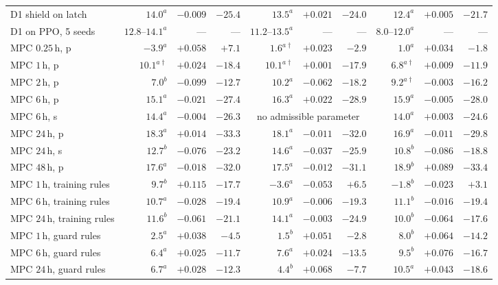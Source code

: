 \documentclass[pdflatex,sn-mathphys-num,iicol]{sn-jnl}
\theoremstyle{thmstyleone}\newtheorem{proposition}{Proposition}\newtheorem{corollary}{Corollary}
\theoremstyle{thmstyletwo}\newtheorem{remark}{Remark}\newtheorem{observation}{Observation}
\theoremstyle{thmstylethree}\newtheorem{definition}{Definition}
\begin{document}
\begin{table}[t]
\begin{tabular*}{\textwidth}{@{\extracolsep{\fill}}lrrrrrrrrr@{}}
D1 shield on latch & $14.0^{a}$ & $-0.009$ & $-25.4$ & $13.5^{a}$ & $+0.021$ & $-24.0$ & $12.4^{a}$ & $+0.005$ & $-21.7$ \\
D1 on PPO, 5 seeds & $12.8$--$14.1^{a}$ & --- & --- & $11.2$--$13.5^{a}$ & --- & --- & $8.0$--$12.0^{a}$ & --- & --- \\
MPC $0.25\,$h, p & $-3.9^{a}$ & $+0.058$ & $+7.1$ & $1.6^{a\dagger}$ & $+0.023$ & $-2.9$ & $1.0^{a}$ & $+0.034$ & $-1.8$ \\
MPC $1\,$h, p & $10.1^{a\dagger}$ & $+0.024$ & $-18.4$ & $10.1^{a\dagger}$ & $+0.001$ & $-17.9$ & $6.8^{a\dagger}$ & $+0.009$ & $-11.9$ \\
MPC $2\,$h, p & $7.0^{b}$ & $-0.099$ & $-12.7$ & $10.2^{a}$ & $-0.062$ & $-18.2$ & $9.2^{a\dagger}$ & $-0.003$ & $-16.2$ \\
MPC $6\,$h, p & $15.1^{a}$ & $-0.021$ & $-27.4$ & $16.3^{a}$ & $+0.022$ & $-28.9$ & $15.9^{a}$ & $-0.005$ & $-28.0$ \\
MPC $6\,$h, s & $14.4^{a}$ & $-0.004$ & $-26.3$ & \multicolumn{3}{c}{\footnotesize no admissible parameter} & $14.0^{a}$ & $+0.003$ & $-24.6$ \\
MPC $24\,$h, p & $18.3^{a}$ & $+0.014$ & $-33.3$ & $18.1^{a}$ & $-0.011$ & $-32.0$ & $16.9^{a}$ & $-0.011$ & $-29.8$ \\
MPC $24\,$h, s & $12.7^{b}$ & $-0.076$ & $-23.2$ & $14.6^{a}$ & $-0.037$ & $-25.9$ & $10.8^{b}$ & $-0.086$ & $-18.8$ \\
MPC $48\,$h, p & $17.6^{a}$ & $-0.018$ & $-32.0$ & $17.5^{a}$ & $-0.012$ & $-31.1$ & $18.9^{b}$ & $+0.089$ & $-33.4$ \\
MPC $1\,$h, training rules & $9.7^{b}$ & $+0.115$ & $-17.7$ & $-3.6^{a}$ & $-0.053$ & $+6.5$ & $-1.8^{b}$ & $-0.023$ & $+3.1$ \\
MPC $6\,$h, training rules & $10.7^{a}$ & $-0.028$ & $-19.4$ & $10.9^{a}$ & $-0.006$ & $-19.3$ & $11.1^{b}$ & $-0.016$ & $-19.4$ \\
MPC $24\,$h, training rules & $11.6^{b}$ & $-0.061$ & $-21.1$ & $14.1^{a}$ & $-0.003$ & $-24.9$ & $10.0^{b}$ & $-0.064$ & $-17.6$ \\
MPC $1\,$h, guard rules & $2.5^{a}$ & $+0.038$ & $-4.5$ & $1.5^{b}$ & $+0.051$ & $-2.8$ & $8.0^{b}$ & $+0.064$ & $-14.2$ \\
MPC $6\,$h, guard rules & $6.4^{a}$ & $+0.025$ & $-11.7$ & $7.6^{a}$ & $+0.024$ & $-13.5$ & $9.5^{b}$ & $+0.076$ & $-16.7$ \\
MPC $24\,$h, guard rules & $6.7^{a}$ & $+0.028$ & $-12.3$ & $4.4^{b}$ & $+0.068$ & $-7.7$ & $10.5^{a}$ & $+0.043$ & $-18.6$ \\

\end{tabular*}
\end{table}
\end{document}
